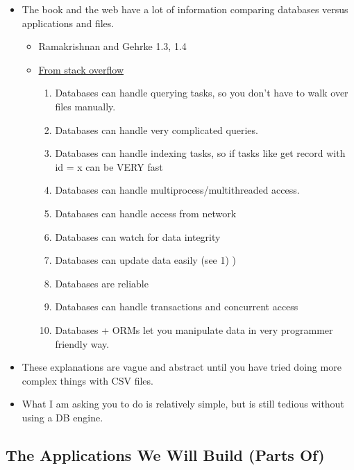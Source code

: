 \documentclass[11pt]{article}
\providecommand{\tightlist}{%
      \setlength{\itemsep}{0pt}\setlength{\parskip}{0pt}}
\begin{document}
\begin{itemize}
\item
  The book and the web have a lot of information comparing databases
  versus applications and files.

  \begin{itemize}
  \tightlist
  \item
    Ramakrishnan and Gehrke 1.3, 1.4
  \item
    \href{https://stackoverflow.com/questions/2356851/database-vs-flat-files}{From
    stack overflow}

    \begin{enumerate}
    \def\labelenumi{\arabic{enumi}.}
    \tightlist
    \item
      Databases can handle querying tasks, so you don't have to walk
      over files manually.
    \item
      Databases can handle very complicated queries.
    \item
      Databases can handle indexing tasks, so if tasks like get record
      with id = x can be VERY fast
    \item
      Databases can handle multiprocess/multithreaded access.
    \item
      Databases can handle access from network
    \item
      Databases can watch for data integrity
    \item
      Databases can update data easily (see 1) )
    \item
      Databases are reliable
    \item
      Databases can handle transactions and concurrent access
    \item
      Databases + ORMs let you manipulate data in very programmer
      friendly way.
    \end{enumerate}
  \end{itemize}
\item
  These explanations are vague and abstract until you have tried doing
  more complex things with CSV files.
\item
  What I am asking you to do is relatively simple, but is still tedious
  without using a DB engine.
\end{itemize}

    \subsection{The Applications We Will Build (Parts
Of)}\label{the-applications-we-will-build-parts-of}
\end{document}
